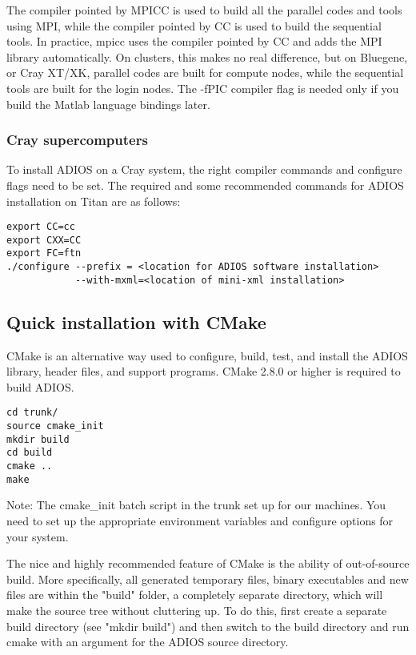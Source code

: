 The compiler pointed by MPICC is used to build all the parallel codes and tools
using MPI, while the compiler pointed by CC is used to build the sequential tools.
In practice, mpicc uses the compiler pointed by CC and adds the MPI library automatically.
On clusters, this makes no real difference, but on Bluegene, or Cray XT/XK, parallel
codes are built for compute nodes, while the sequential tools are built for the
login nodes. The -fPIC compiler flag is needed only if you build the
Matlab language bindings later.


\subsubsection{Cray supercomputers}

To install ADIOS on a Cray system, the right compiler commands and configure flags
need to be set. The required and some recommended commands for ADIOS installation on
Titan are as follows:

\begin{lstlisting}
export CC=cc
export CXX=CC
export FC=ftn
./configure --prefix = <location for ADIOS software installation>
            --with-mxml=<location of mini-xml installation>
\end{lstlisting}

\subsection{Quick installation with CMake}

CMake is an alternative way used to configure, build, test, and install the ADIOS library,
header files, and support programs. CMake 2.8.0 or higher is required to build ADIOS.

\begin{lstlisting}
cd trunk/
source cmake_init
mkdir build
cd build
cmake ..
make
\end{lstlisting}

Note: The cmake\_init batch script in the trunk set up for our machines. You need to
set up the appropriate environment variables and configure options for your system.

The nice and highly recommended feature of CMake is the ability of out-of-source build.
More specifically, all generated temporary files, binary executables and new files are within
the "build" folder, a completely separate directory, which will make the source tree without cluttering up. To do this,
first create a separate build directory (see "mkdir build")
and then switch to the build directory and run cmake with an argument for the ADIOS source directory.

